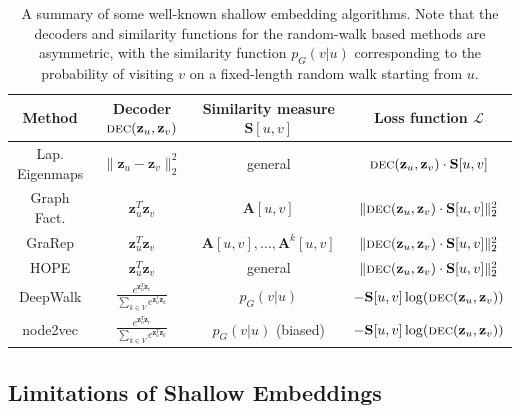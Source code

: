 \documentclass[10pt]{book}
\begin{document}
\begin{table}[ht]
    \centering
    \begin{tabular}{cccc}
        \toprule
        Method &  Decoder $\textsc{dec}(\mathbf{z}_u, \mathbf{z}_v)$ & Similarity measure $\mathbf S[u,v]$ & Loss function $\mathcal L$ \\
        \midrule
        Lap. Eigenmaps & $\|\mathbf{z}_u - \mathbf{z}_v\|_2^2$ & general & $\textsc{dec}(\mathbf{z}_u, \mathbf{z}_v)\cdot \mathbf S[u,v]$ \\
        
        Graph Fact. & $\mathbf{z}_u^T \mathbf{z}_v$ & $\mathbf A[u,v]$ & $\|\textsc{dec}(\mathbf{z}_u, \mathbf{z}_v) \cdot \mathbf S[u,v]\|^2_2$ \\
        
        GraRep & $\mathbf{z}_u^T \mathbf{z}_v$ & $\mathbf A[u,v],\ldots,\mathbf A^k[u,v]$ & $\|\textsc{dec}(\mathbf{z}_u, \mathbf{z}_v) \cdot \mathbf S[u,v]\|^2_2$ \\
        
        HOPE & $\mathbf{z}_u^T \mathbf{z}_v$ & general & $\|\textsc{dec}(\mathbf{z}_u, \mathbf{z}_v) \cdot \mathbf S[u,v]\|^2_2$ \\
        
        DeepWalk & $\frac{e^{\mathbf{z}_u^T \mathbf{z}_v}}{\sum_{k \in V} e^{ \mathbf{z}_u^T \mathbf{z}_k}}$ & $p_G(v|u)$ & $- \mathbf S[u,v] \log(\textsc{dec}(\mathbf{z}_u, \mathbf{z}_v))$ \\
        
        node2vec & $\frac{e^{\mathbf{z}_u^T \mathbf{z}_v}}{\sum_{k \in V} e^{ \mathbf{z}_u^T \mathbf{z}_k}}$ & $p_G(v|u)$ (biased) & $- \mathbf S[u,v] \log(\textsc{dec}(\mathbf{z}_u, \mathbf{z}_v))$ \\
        \bottomrule
    \end{tabular}
    \caption{A summary of some well-known shallow embedding algorithms. Note that the decoders and similarity functions for the random-walk based methods are asymmetric, with the similarity function $p_G(v|u)$ corresponding to the probability of visiting $v$ on a fixed-length random walk starting from $u$.}
    \label{tab:shallowembalg}
\end{table}

\subsection{Limitations of Shallow Embeddings}
\end{document}
